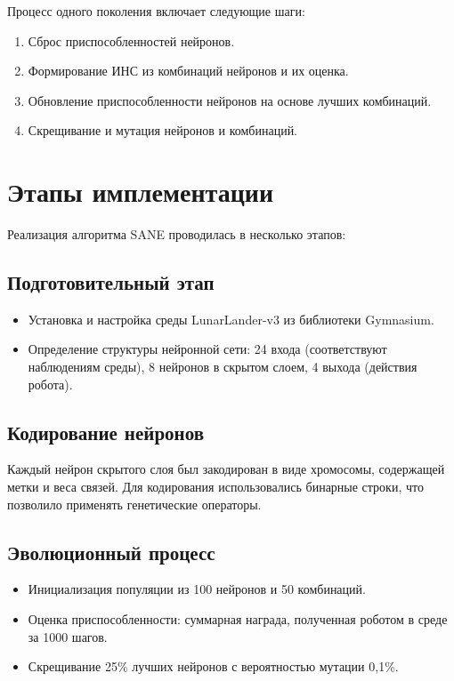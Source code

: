 \documentclass[a4paper,12pt]{article}
\begin{document}
Процесс одного поколения включает следующие шаги:
\begin{enumerate}
    \item Сброс приспособленностей нейронов.
    \item Формирование ИНС из комбинаций нейронов и их оценка.
    \item Обновление приспособленности нейронов на основе лучших комбинаций.
    \item Скрещивание и мутация нейронов и комбинаций.
\end{enumerate}

\section{Этапы имплементации}
Реализация алгоритма SANE проводилась в несколько этапов:

\subsection{Подготовительный этап}
\begin{itemize}
    \item Установка и настройка среды LunarLander-v3 из библиотеки Gymnasium.
    \item Определение структуры нейронной сети: 24 входа (соответствуют наблюдениям среды), 8 нейронов в скрытом слоем, 4 выхода (действия робота).
\end{itemize}

\subsection{Кодирование нейронов}
Каждый нейрон скрытого слоя был закодирован в виде хромосомы, содержащей метки и веса связей. Для кодирования использовались бинарные строки, что позволило применять генетические операторы.

\subsection{Эволюционный процесс}
\begin{itemize}
    \item Инициализация популяции из 100 нейронов и 50 комбинаций.
    \item Оценка приспособленности: суммарная награда, полученная роботом в среде за 1000 шагов.
    \item Скрещивание 25\% лучших нейронов с вероятностью мутации 0,1\%.
\end{itemize}
\end{document}
